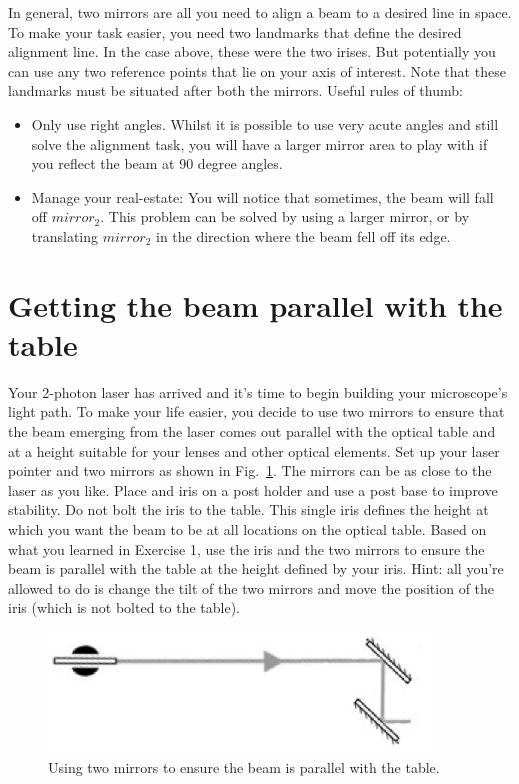 \documentclass[a4paper]{report}
\begin{document}
In general, two mirrors are all you need to align a beam to a desired line in space. 
To make your task easier, you need two landmarks that define the desired alignment line. 
In the case above, these were the two irises. 
But potentially you can use any two reference points that lie on your axis of interest. 
Note that these landmarks must be situated after both the mirrors.
Useful rules of thumb:
\begin{itemize}
\item Only use right angles. 
Whilst it is possible to use very acute angles and still solve the alignment task, you will have a larger mirror area to play with if you reflect the beam at 90 degree angles.
\item Manage your real-estate: You will notice that sometimes, the beam will fall off $mirror_2$. This problem can be solved by using a larger mirror, or by translating $mirror_2$ in the direction where the beam fell off its edge.
\end{itemize}


\section{Getting the beam parallel with the table}
Your 2-photon laser has arrived and it's time to begin building your microscope's light path. 
To make your life easier, you decide to use two mirrors to ensure that the beam emerging from the laser comes out parallel with the optical table and at a height suitable for your lenses and other optical elements. 
Set up your laser pointer and two mirrors as shown in Fig.~\ref{fig:ex2}. 
The mirrors can be as close to the laser as you like. 
Place and iris on a post holder and use a post base to improve stability. 
Do not bolt the iris to the table.
This single iris defines the height at which you want the beam to be at all locations on the optical table. 
Based on what you learned in Exercise 1, use the iris and the two mirrors to ensure the beam is parallel with the table at the height defined by your iris. 
Hint: all you're allowed to do is change the tilt of the two mirrors and move the position of the iris (which is not bolted to the table).


\begin{figure}[h]
\center
\includegraphics[width=4in]{laser_height.eps}
\caption{Using two mirrors to ensure the beam is parallel with the table. }
\label{fig:ex2}
\end{figure}
\end{document}
